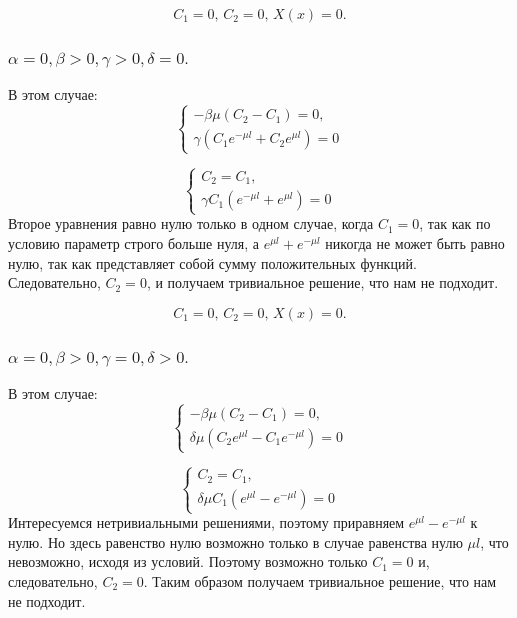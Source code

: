 \documentclass[12pt, a4paper]{article}
\begin{document}
\[ C_{1} = 0, \, C_{2} = 0, \, X(x) = 0. \]

\subsubsection{ $ \alpha = 0, \beta > 0, \gamma > 0, \delta = 0. $}
В этом случае:
\begin{displaymath}
	\begin{cases}
		- \beta \mu (C_{2} - C_{1}) = 0, \\
		\gamma (C_{1} e^{-\mu l} + C_{2} e^{\mu l}) = 0
	\end{cases}
\end{displaymath}

\begin{displaymath}
	\begin{cases}
		C_{2} = C_{1}, \\
		\gamma C_{1} (e^{-\mu l} + e^{\mu l}) = 0
	\end{cases}
\end{displaymath}
Второе уравнения равно нулю только в одном случае, когда $C_{1} = 0$, так как по условию параметр строго больше нуля, а $e^{\mu l} + e^{-\mu l}$ никогда не может быть равно нулю, так как представляет собой сумму положительных функций. Следовательно, $C_{2} = 0$, и получаем тривиальное решение, что нам не подходит.

\[ C_{1} = 0, \, C_{2} = 0, \, X(x) = 0. \]

\subsubsection{ $ \alpha = 0, \beta > 0, \gamma = 0, \delta > 0. $}
В этом случае:
\begin{displaymath}
	\begin{cases}
		- \beta \mu (C_{2} - C_{1}) = 0, \\
		\delta \mu (C_{2} e^{\mu l} - C_{1} e^{-\mu l}) = 0
	\end{cases}
\end{displaymath}

\begin{displaymath}
	\begin{cases}
		C_{2} = C_{1}, \\
		\delta \mu C_{1} (e^{\mu l} - e^{-\mu l}) = 0
	\end{cases}
\end{displaymath}
Интересуемся нетривиальными решениями, поэтому приравняем $e^{\mu l} - e^{-\mu l}$ к нулю. Но здесь равенство нулю возможно только в случае равенства нулю $\mu l$, что невозможно, исходя из условий. Поэтому возможно только $C_{1} = 0$ и, следовательно, $C_{2} = 0$. Таким образом получаем тривиальное решение, что нам не подходит.
\end{document}

